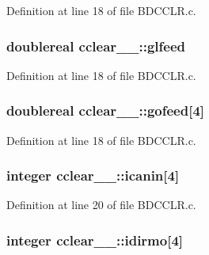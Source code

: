 Definition at line 18 of file B\+D\+C\+C\+L\+R.\+c.

\subsubsection[{\texorpdfstring{glfeed}{glfeed}}]{\setlength{\rightskip}{0pt plus 5cm}doublereal cclear\+\_\+\_\+\+::glfeed}\hypertarget{structcclear__1___afc1e683ac8daa27a7285ce6ce4172efb}{}\label{structcclear__1___afc1e683ac8daa27a7285ce6ce4172efb}


Definition at line 18 of file B\+D\+C\+C\+L\+R.\+c.

\subsubsection[{\texorpdfstring{gofeed}{gofeed}}]{\setlength{\rightskip}{0pt plus 5cm}doublereal cclear\+\_\+\_\+\+::gofeed\mbox{[}4\mbox{]}}\hypertarget{structcclear__1___a493221579dcabeb94c569da046450b15}{}\label{structcclear__1___a493221579dcabeb94c569da046450b15}


Definition at line 18 of file B\+D\+C\+C\+L\+R.\+c.

\subsubsection[{\texorpdfstring{icanin}{icanin}}]{\setlength{\rightskip}{0pt plus 5cm}integer cclear\+\_\+\_\+\+::icanin\mbox{[}4\mbox{]}}\hypertarget{structcclear__1___a1de2d48aba01f00b2dbf2cb46b9eea35}{}\label{structcclear__1___a1de2d48aba01f00b2dbf2cb46b9eea35}


Definition at line 20 of file B\+D\+C\+C\+L\+R.\+c.

\subsubsection[{\texorpdfstring{idirmo}{idirmo}}]{\setlength{\rightskip}{0pt plus 5cm}integer cclear\+\_\+\_\+\+::idirmo\mbox{[}4\mbox{]}}\hypertarget{structcclear__1___ac5075c8128ae79543dea26f318409fbd}{}\label{structcclear__1___ac5075c8128ae79543dea26f318409fbd}


